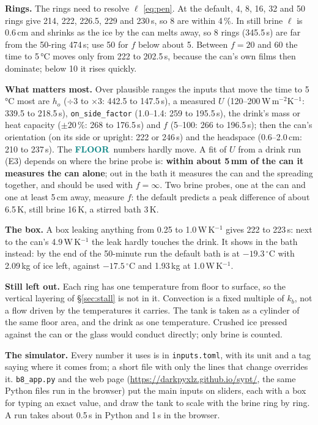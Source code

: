 \documentclass[11pt,a4paper]{article}
\newcommand{\dC}{\,^{\circ}\mathrm{C}}
\newcommand{\code}[1]{\texttt{#1}}
\newcommand{\FLOOR}{\textcolor{teal}{\textsf{\bfseries FLOOR}}}
\begin{document}
\textbf{Rings.} The rings need to resolve $\ell$ \eqref{eq:pen}. At the default, 4, 8, 16, 32 and
50 rings give 214, 222, 226.5, 229 and 230\,s, so 8 are within 4\,\%. In still brine $\ell$ is
0.6\,cm and shrinks as the ice by the can melts away, so 8 rings (345.5\,s) are far from the 50-ring
474\,s; use 50 for $f$ below about 5. Between $f = 20$ and 60 the time to 5\,°C moves only from 222 to
202.5\,s, because the can's own films then dominate; below 10 it rises quickly.

\textbf{What matters most.} Over plausible ranges the inputs that move the time to 5\,°C most are
$h_o$ ($\div 3$ to $\times 3$: 442.5 to 147.5\,s), a measured $U$ (120–200\,W\,m$^{-2}$K$^{-1}$: 339.5 to 218.5\,s),
\code{on\_side\_factor} (1.0–1.4: 259 to 195.5\,s), the drink's mass or heat capacity ($\pm 20$\,\%: 268
to 176.5\,s) and $f$ (5–100: 266 to 196.5\,s); then the can's orientation (on its side or upright: 222 or
246\,s) and the headspace (0.6–2.0\,cm: 210 to 237\,s). The \FLOOR\ numbers hardly move. A fit of $U$ from a
drink run (E3) depends on where the brine probe is: \textbf{within about 5\,mm of the can it measures the
can alone}; out in the bath it measures the can and the spreading together, and should be used with
$f = \infty$. Two brine probes, one at the can and one at least 5\,cm away, measure $f$: the default
predicts a peak difference of about 6.5\,K, still brine 16\,K, a stirred bath 3\,K.

\textbf{The box.} A box leaking anything from 0.25 to 1.0\,W\,K$^{-1}$ gives 222 to 223\,s: next to the
can's 4.9\,W\,K$^{-1}$ the leak hardly touches the drink. It shows in the bath instead: by the end of the
50-minute run the default bath is at $-19.3\dC$ with 2.09\,kg of ice left, against $-17.5\dC$ and
1.93\,kg at 1.0\,W\,K$^{-1}$.

\textbf{Still left out.} Each ring has one temperature from floor to surface, so the vertical layering of
§\ref{sec:stall} is not in it. Convection is a fixed multiple of $k_b$, not a flow driven by the
temperatures it carries. The tank is taken as a cylinder of the same floor area, and the drink as one
temperature. Crushed ice pressed against the can or the glass would conduct directly; only brine is
counted.

\textbf{The simulator.} Every number it uses is in \code{inputs.toml}, with its unit and a tag saying
where it comes from; a short file with only the lines that change overrides it. \code{b8\_app.py} and
the web page (\url{https://darkpyxlz.github.io/sypt/}, the same Python files run in the browser) put
the main inputs on sliders, each with a box for typing an exact value, and draw the tank to scale with
the brine ring by ring. A run takes about 0.5\,s in Python and 1\,s in the browser.
\end{document}
